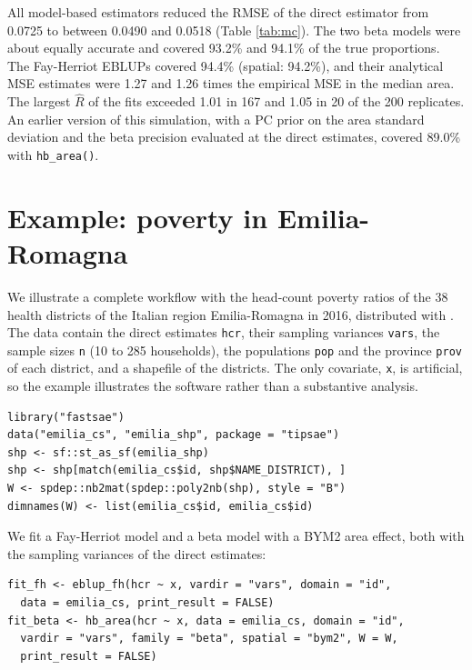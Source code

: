 All model-based estimators reduced the RMSE of the direct estimator from 0.0725 to between 0.0490 and 0.0518 (Table \ref{tab:mc}). The two beta models were about equally accurate and covered 93.2\% and 94.1\% of the true proportions. The Fay-Herriot EBLUPs covered 94.4\% (spatial: 94.2\%), and their analytical MSE estimates were 1.27 and 1.26 times the empirical MSE in the median area. The largest \(\hat{R}\) of the  fits exceeded 1.01 in 167 and 1.05 in 20 of the 200 replicates. An earlier version of this simulation, with a PC prior on the area standard deviation and the beta precision evaluated at the direct estimates, covered 89.0\% with \texttt{hb\_area()}.

\section{Example: poverty in Emilia-Romagna}\label{sec:applications}

We illustrate a complete workflow with the head-count poverty ratios of the 38 health districts of the Italian region Emilia-Romagna in 2016, distributed with  \citep{denicolo2024tipsae}. The data contain the direct estimates \texttt{hcr}, their sampling variances \texttt{vars}, the sample sizes \texttt{n} (10 to 285 households), the populations \texttt{pop} and the province \texttt{prov} of each district, and a shapefile of the districts. The only covariate, \texttt{x}, is artificial, so the example illustrates the software rather than a substantive analysis.

\begin{verbatim}
library("fastsae")
data("emilia_cs", "emilia_shp", package = "tipsae")
shp <- sf::st_as_sf(emilia_shp)
shp <- shp[match(emilia_cs$id, shp$NAME_DISTRICT), ]
W <- spdep::nb2mat(spdep::poly2nb(shp), style = "B")
dimnames(W) <- list(emilia_cs$id, emilia_cs$id)
\end{verbatim}

We fit a Fay-Herriot model and a beta model with a BYM2 area effect, both with the sampling variances of the direct estimates:

\begin{verbatim}
fit_fh <- eblup_fh(hcr ~ x, vardir = "vars", domain = "id",
  data = emilia_cs, print_result = FALSE)
fit_beta <- hb_area(hcr ~ x, data = emilia_cs, domain = "id",
  vardir = "vars", family = "beta", spatial = "bym2", W = W,
  print_result = FALSE)
\end{verbatim}

